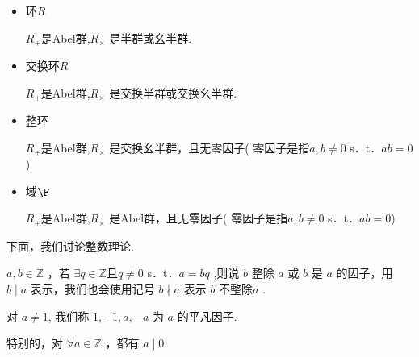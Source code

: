 \begin{definition}
\begin{itemize}
		
		
		\item 环$R$
		
		$R_{+}$是Abel群,$R_\times$ 是半群或幺半群.
		\item 交换环$R$
		
		$R_{+}$是Abel群,$R_\times
		$ 是交换半群或交换幺半群.
		\item 整环
		
		$R_{+}$是Abel群,$R_\times$ 是交换幺半群，且无零因子( 零因子是指$a, b \neq 0$ s．t．$a b=0$)
		\item 域$\F$
		
		$R_{+}$是Abel群,$R_\times$ 是Abel群，且无零因子( 零因子是指$a, b \neq 0$ s．t．$a b=0$)
	\end{itemize}
	
	
\end{definition}

下面，我们讨论整数理论.
\begin{definition}\label{p1:concept:c1-l59}
	$a, b \in \mathbb{Z}$ ，若 $\exists q \in \mathbb{Z}\text{且}q\ne0$ s．t．$a=b q$  ,则说 $b$ 整除 $a$ 或 $b$ 是 $a$ 的因子，用 $b \mid a$ 表示，我们也会使用记号 $b \nmid a$ 表示 $b$ 不整除$a$ .
	
	对 $a \neq 1$, 我们称 $1,-1, a,-a$ 为 $a$ 的平凡因子.
	
	特别的，对 $\forall a \in \mathbb{Z}$ ，都有 $a\mid0$.
	
\end{definition}

